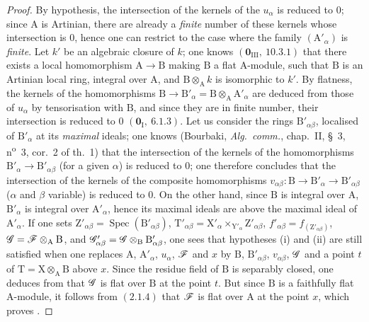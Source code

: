 \begin{proof}
By hypothesis, the intersection of the kernels of the $u_\alpha$ is reduced to $0$; since $\mathrm{A}$ is Artinian,
there are already a \emph{finite} number of these kernels whose intersection is $0$, hence one can
restrict to the case where the family $(\mathrm{A}'_\alpha)$ is \emph{finite}. Let $k'$ be an algebraic closure of $k$; one knows
$(\mathbf{0}_{\mathrm{III}},~10.3.1)$ that there exists a local homomorphism $\mathrm{A}\to\mathrm{B}$ making $\mathrm{B}$ a flat $\mathrm{A}$-module,
such that $\mathrm{B}$ is an Artinian local ring, integral over $\mathrm{A}$, and $\mathrm{B}\otimes_\mathrm{A} k$ is isomorphic to $k'$.
By flatness, the kernels of the homomorphisms $\mathrm{B}\to\mathrm{B}'_\alpha=\mathrm{B}\otimes_\mathrm{A}\mathrm{A}'_\alpha$ are deduced from those of
$u_\alpha$ by tensorisation with $\mathrm{B}$, and since they are in finite number, their intersection is
reduced to $0$ $(\mathbf{0}_\mathrm{I},~6.1.3)$. Let us consider the rings $\mathrm{B}'_{\alpha\beta}$, localised of $\mathrm{B}'_\alpha$ at its \emph{maximal} ideals;
one knows (Bourbaki, \emph{Alg.\ comm.}, chap.~II, \S~3, n\textsuperscript{o}~3, cor.~2 of th.~1) that the intersection
of the kernels of the homomorphisms $\mathrm{B}'_\alpha\to\mathrm{B}'_{\alpha\beta}$ (for a given $\alpha$) is reduced to $0$; one therefore concludes
that the intersection of the kernels of the composite homomorphisms $v_{\alpha\beta}:\mathrm{B}\to\mathrm{B}'_\alpha\to\mathrm{B}'_{\alpha\beta}$ ($\alpha$ and
$\beta$ variable) is reduced to $0$. On the other hand, since $\mathrm{B}$ is integral over $\mathrm{A}$, $\mathrm{B}'_\alpha$ is integral over $\mathrm{A}'_\alpha$,
hence its maximal ideals are above the maximal ideal of $\mathrm{A}'_\alpha$. If one sets
$\mathrm{Z}'_{\alpha\beta}=\operatorname{Spec}(\mathrm{B}'_{\alpha\beta})$,
$\mathrm{T}'_{\alpha\beta}=\mathrm{X}'_\alpha\times_{\mathrm{Y}'_\alpha}\mathrm{Z}'_{\alpha\beta}$,
$f'_{\alpha\beta}=f_{(\mathrm{Z}'_{\alpha\beta})}$,
$\mathscr{G}=\mathscr{F}\otimes_\mathrm{A}\mathrm{B}$, and
$\mathscr{G}'_{\alpha\beta}=\mathscr{G}\otimes_\mathrm{B}\mathrm{B}'_{\alpha\beta}$, one sees
that hypotheses (i) and (ii) are still satisfied when one replaces
$\mathrm{A}$, $\mathrm{A}'_\alpha$, $u_\alpha$, $\mathscr{F}$ and $x$ by $\mathrm{B}$, $\mathrm{B}'_{\alpha\beta}$, $v_{\alpha\beta}$, $\mathscr{G}$ and a point $t$ of $\mathrm{T}=\mathrm{X}\otimes_\mathrm{A}\mathrm{B}$ above $x$.
Since the residue field of $\mathrm{B}$ is separably closed, one deduces from  that
$\mathscr{G}$ is flat over $\mathrm{B}$ at the point $t$. But since $\mathrm{B}$ is a faithfully flat $\mathrm{A}$-module, it follows from $(2.1.4)$
that $\mathscr{F}$ is flat over $\mathrm{A}$ at the point $x$, which proves .
\end{proof}

